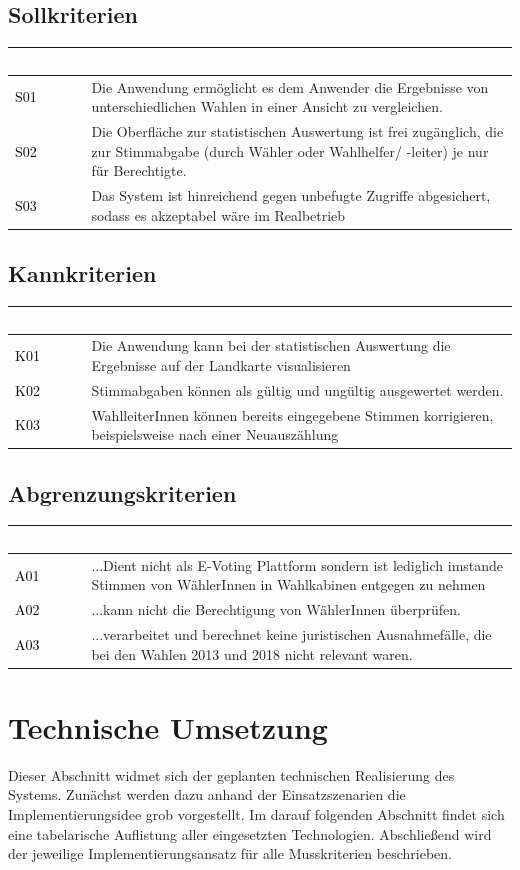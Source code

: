 \documentclass[a4paper,12pt]{article}
\newcommand\addrow[2]{\textcolor{black}{#1} &#2\\ \hline}
\newcommand\addheading[2]{\rowcolor{TUMBlue}\textcolor{white}{#1} & \textcolor{white}{#2}\\ \hline}
\newcommand\tabularhead{\begin{tabular}{|b|p{13cm}|}
\hline
}
\newenvironment{usecase}{\tabularhead}
{\hline\end{tabular}}
\begin{document}
\subsection{Sollkriterien}
\begin{usecase}
	\addheading{Nummer}{Beschreibung} 
	\addrow{S01}{Die Anwendung ermöglicht es dem Anwender die Ergebnisse von unterschiedlichen Wahlen in einer Ansicht zu vergleichen.}
      \addrow{S02}{Die Oberfläche zur statistischen Auswertung ist frei zugänglich, die zur Stimmabgabe (durch Wähler oder Wahlhelfer/ -leiter) je nur für Berechtigte.}
      \addrow{S03}{Das System ist hinreichend gegen unbefugte Zugriffe abgesichert, sodass es akzeptabel wäre im Realbetrieb}
\end{usecase}
\subsection{Kannkriterien}
\begin{usecase}
	\addheading{Nummer}{Beschreibung} 
	\addrow{K01}{Die Anwendung kann bei der statistischen Auswertung die Ergebnisse auf der Landkarte visualisieren}
      \addrow{K02}{Stimmabgaben können als gültig und ungültig ausgewertet werden.}
	\addrow{K03}{WahlleiterInnen können bereits eingegebene Stimmen korrigieren, beispielsweise nach einer Neuauszählung}
\end{usecase}

\subsection{Abgrenzungskriterien}
\begin{usecase}
      \addheading{Nummer}{Das System...} 
      \addrow{A01}{...Dient nicht als E-Voting Plattform sondern ist lediglich imstande Stimmen von WählerInnen in Wahlkabinen entgegen zu nehmen}
	\addrow{A02}{...kann nicht die Berechtigung von WählerInnen überprüfen.}
	\addrow{A03}{...verarbeitet und berechnet keine juristischen Ausnahmefälle, die bei den Wahlen 2013 und 2018 nicht relevant waren.}
\end{usecase}

\section{Technische Umsetzung}
Dieser Abschnitt widmet sich der geplanten technischen Realisierung
des Systems. Zunächst werden dazu anhand der Einsatzszenarien die Implementierungsidee
grob vorgestellt. Im darauf folgenden Abschnitt findet sich eine tabelarische 
Auflistung aller eingesetzten Technologien. Abschließend
wird der jeweilige Implementierungsansatz für alle Musskriterien beschrieben.
\end{document}
